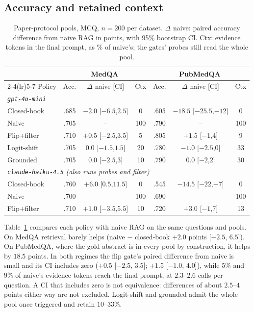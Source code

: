 \documentclass[11pt]{article}
\begin{document}
\subsection{Accuracy and retained context}
\label{sec:eval-fid}
\begin{table}[t]
\centering\scriptsize\setlength{\tabcolsep}{1.6pt}
\begin{tabular}{lcccccc}
\toprule
 & \multicolumn{3}{c}{MedQA} & \multicolumn{3}{c}{PubMedQA}\\
\cmidrule(lr){2-4}\cmidrule(lr){5-7}
Policy & Acc. & $\Delta$ naive [CI] & Ctx & Acc. & $\Delta$ naive [CI] & Ctx\\
\midrule
\multicolumn{7}{l}{\textit{\texttt{gpt-4o-mini}}}\\
Closed-book & .685 & $-2.0$ [$-6.5$,$2.5$] & 0 & .605 & $-18.5$ [$-25.5$,$-12$] & 0\\
Naive & .705 & -- & 100 & .790 & -- & 100\\
Flip+filter & .710 & $+0.5$ [$-2.5$,$3.5$] & 5 & .805 & $+1.5$ [$-1$,$4$] & 9\\
Logit-shift & .705 & $0.0$ [$-1.5$,$1.5$] & 20 & .780 & $-1.0$ [$-2.5$,$0$] & 33\\
Grounded & .705 & $0.0$ [$-2.5$,$3$] & 10 & .790 & $0.0$ [$-2$,$2$] & 30\\
\midrule
\multicolumn{7}{l}{\textit{\texttt{claude-haiku-4.5} (also runs probes and filter)}}\\
Closed-book & .760 & $+6.0$ [$0.5$,$11.5$] & 0 & .545 & $-14.5$ [$-22$,$-7$] & 0\\
Naive & .700 & -- & 100 & .690 & -- & 100\\
Flip+filter & .710 & $+1.0$ [$-3.5$,$5.5$] & 10 & .720 & $+3.0$ [$-1$,$7$] & 13\\
\bottomrule
\end{tabular}
\caption{Paper-protocol pools, MCQ, $n{=}200$ per dataset. $\Delta$ naive:
paired accuracy difference from naive RAG in points, with 95\% bootstrap CI.
Ctx: evidence tokens in the final prompt, as \% of naive's; the gates' probes
still read the whole pool.}
\label{tab:fid}
\end{table}

Table~\ref{tab:fid} compares each policy with naive RAG on the same questions and
pools. On MedQA retrieval barely helps (naive $-$ closed-book $+2.0$ points
[$-2.5$, $6.5$]). On PubMedQA, where the gold abstract is in every pool by
construction, it helps by $18.5$ points. In both regimes the flip gate's paired
difference from naive is small and its CI includes zero ($+0.5$ [$-2.5$, $3.5$];
$+1.5$ [$-1.0$, $4.0$]), while $5\%$ and $9\%$ of naive's evidence tokens
reach the final prompt, at $2.3$--$2.6$ calls per question. A CI that includes
zero is not equivalence: differences of about $2.5$--$4$ points either way are
not excluded. Logit-shift and grounded admit the whole pool once triggered and
retain $10$--$33\%$.
\end{document}
